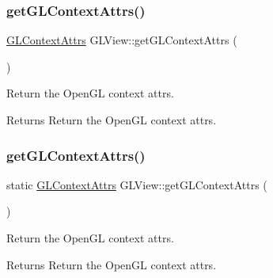 \mbox{\label{classGLView_a763e8536b9443103dec35f4f0cc843ff}} 
\subsubsection{\texorpdfstring{get\+G\+L\+Context\+Attrs()}{getGLContextAttrs()}\hspace{0.1cm}{\footnotesize\ttfamily [1/2]}}
{\footnotesize\ttfamily \hyperlink{structGLContextAttrs}{G\+L\+Context\+Attrs} G\+L\+View\+::get\+G\+L\+Context\+Attrs (\begin{DoxyParamCaption}{ }\end{DoxyParamCaption})\hspace{0.3cm}{\ttfamily [static]}}

Return the Open\+GL context attrs.

\begin{DoxyReturn}{Returns}
Return the Open\+GL context attrs. 
\end{DoxyReturn}
\mbox{\label{classGLView_affa74828fec36fea7e3acc692c3f1218}} 
\subsubsection{\texorpdfstring{get\+G\+L\+Context\+Attrs()}{getGLContextAttrs()}\hspace{0.1cm}{\footnotesize\ttfamily [2/2]}}
{\footnotesize\ttfamily static \hyperlink{structGLContextAttrs}{G\+L\+Context\+Attrs} G\+L\+View\+::get\+G\+L\+Context\+Attrs (\begin{DoxyParamCaption}{ }\end{DoxyParamCaption})\hspace{0.3cm}{\ttfamily [static]}}

Return the Open\+GL context attrs.

\begin{DoxyReturn}{Returns}
Return the Open\+GL context attrs. 
\end{DoxyReturn}
\mbox{\label{classGLView_a826c04e9fc58895b6a7d95ba68ac1ba1}} 
